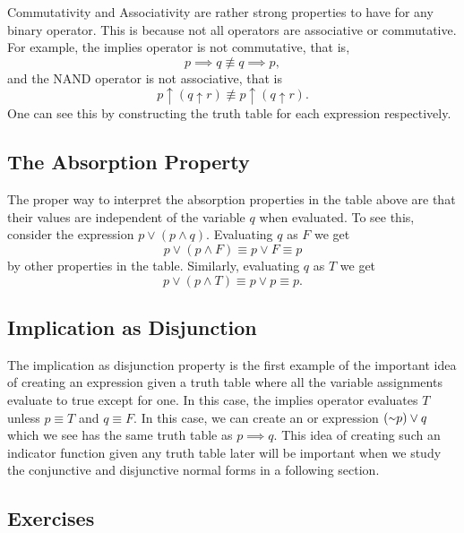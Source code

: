Commutativity and Associativity are rather strong properties to have for any binary operator. This is because not all operators are associative or commutative. For example, the implies operator is not commutative, that is,
\[p \implies q \not\equiv q \implies p,\]
and the NAND operator is not associative, that is
\[p \uparrow (q \uparrow r) \not\equiv p \uparrow (q \uparrow r).\]
One can see this by constructing the truth table for each expression respectively.

\subsection{The Absorption Property}

The proper way to interpret the absorption properties in the table above are that their values are independent of the variable $q$ when evaluated. To see this, consider the expression $p \lor (p \land q)$. Evaluating $q$ as $F$ we get
\[p \lor (p \land F) \equiv p \lor F \equiv p\]
by other properties in the table. Similarly, evaluating $q$ as $T$ we get
\[p \lor (p \land T) \equiv p \lor p \equiv p.\]

\subsection{Implication as Disjunction}

The implication as disjunction property is the first example of the important idea of creating an expression given a truth table where all the variable assignments evaluate to true except for one. In this case, the implies operator evaluates $T$ unless $p \equiv T$ and $q \equiv F$. In this case, we can create an or expression $(\shortsim p) \lor q$ which we see has the same truth table as $p \implies q$. This idea of creating such an indicator function given any truth table later will be important when we study the conjunctive and disjunctive normal forms in a following section.

\subsection{Exercises}
